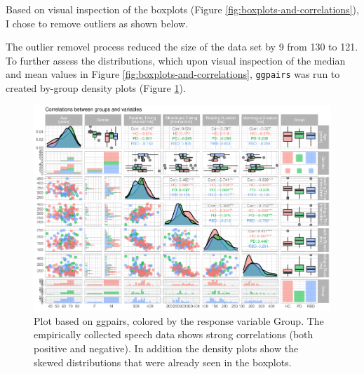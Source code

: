 \documentclass[
  english,
  doc,floatsintext]{apa6}
\newenvironment{Shaded}{\begin{snugshade}}{\end{snugshade}}
\newcommand{\DecValTok}[1]{\textcolor[rgb]{0.00,0.00,0.81}{#1}}
\newcommand{\FunctionTok}[1]{\textcolor[rgb]{0.00,0.00,0.00}{#1}}
\newcommand{\NormalTok}[1]{#1}
\newcommand{\OtherTok}[1]{\textcolor[rgb]{0.56,0.35,0.01}{#1}}
\newcommand{\SpecialCharTok}[1]{\textcolor[rgb]{0.00,0.00,0.00}{#1}}
\newcommand{\StringTok}[1]{\textcolor[rgb]{0.31,0.60,0.02}{#1}}
\begin{document}
Based on visual inspection of the boxplots (Figure \ref{fig:boxplots-and-correlations}),
I chose to remove outliers as shown below.

\begin{Shaded}
\end{Shaded}

The outlier removel process reduced the size of the data set by 9
from 130 to 121. To further assess the
distributions, which upon visual inspection of the median and mean values in
Figure \ref{fig:boxplots-and-correlations}, \texttt{ggpairs} was run to created by-group density
plots (Figure \ref{fig:correlate-ggpairs-plot}).

\begin{figure}

{\centering \includegraphics{dap_report_anja_probst_files/figure-latex/correlate-ggpairs-plot-1} 

}

\caption{Plot based on ggpairs, colored by the response variable Group. The empirically collected speech data shows strong correlations (both positive and negative). In addition the density plots show the skewed distributions that were already seen in the boxplots.}\label{fig:correlate-ggpairs-plot}
\end{figure}
\end{document}
